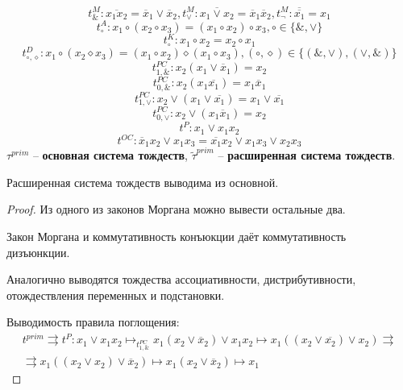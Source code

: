 \documentclass[11pt]{article}
\newcounter{th}\setcounter{th}{0}
\newcounter{stnmt}\setcounter{stnmt}{0}
\def\st{\par\smallskip\refstepcounter{stnmt}\textbf{\arabic{stnmt}}}
\newtheorem*{Statement}{Утверждение \st}
\begin{document}
\begin{equation}
t_{\&}^M: \overline{x_1x_2} = \overline{x}_1\vee\overline{x}_2,
t_{\vee}^M: \overline{x_1\vee x_2} = \overline{x}_1\overline{x}_2,
t_{\neg}^M: \overline{\overline{x_1}} = x_1
\end{equation}
\begin{equation}
t_{\circ}^A: x_1\circ(x_2\circ x_3) = (x_1\circ x_2)\circ x_3, \circ \in \{\&, \vee\}
\end{equation}
\begin{equation}
t_{\circ}^K: x_1\circ x_2 = x_2 \circ x_1
\end{equation}
\begin{equation}
t^D_{\circ, \diamond}: x_1\circ(x_2\diamond x_3) = (x_1\circ x_2)\diamond(x_1\circ x_3),
(\circ, \diamond) \in \{(\&, \vee), (\vee, \&)\}
\end{equation}
\begin{equation}
t_{1, \&}^{PC}: x_2(x_1\vee\overline{x}_1) = x_2
\end{equation}
\begin{equation}
t_{0, \&}^{PC}: x_2(x_1\overline{x_1}) = x_1\overline{x}_1
\end{equation}
\begin{equation}
t_{1, \vee}^{PC}: x_2\vee(x_1\vee\overline{x_1}) = x_1\vee\overline{x_1}
\end{equation}
\begin{equation}
t_{0, \vee}^{PC}: x_2\vee(x_1\overline{x}_1) = x_2
\end{equation}
\begin{equation}
t^P: x_1\vee x_1x_2
\end{equation}
\begin{equation}
t^{OC}: \overline{x}_1x_2\vee x_1x_3 = \overline{x_1}x_2\vee x_1x_3 \vee x_2x_3
\end{equation}
\(\tau^{prim}\) -- \textbf{основная система тождеств}, \(\tilde{\tau}^{prim}\) -- \textbf{расширенная система тождеств}.
\begin{Statement}
Расширенная система тождеств выводима из основной.
\end{Statement}
\begin{proof}
Из одного из законов Моргана можно вывести остальные два.

Закон Моргана и коммутативность конъюкции даёт коммутативность дизъюнкции.

Аналогично выводятся тождества ассоциативности, дистрибутивности, отождествления переменных
и подстановки.

Выводимость правила поглощения:
\begin{multline}
t^{prim} \rightrightarrows t^P: x_1\vee x_1x_2 \mapsto_{t^{PC}_{1, \&}} x_1(x_2\vee\overline{x}_2)
\vee x_1x_2 \mapsto x_1((x_2\vee\overline{x_2})\vee x_2) \rightrightarrows \\
\rightrightarrows x_1((x_2\vee x_2)\vee\overline{x}_2) \mapsto x_1(x_2\vee\overline{x}_2) \mapsto x_1
\end{multline}
\end{proof}
\end{document}
